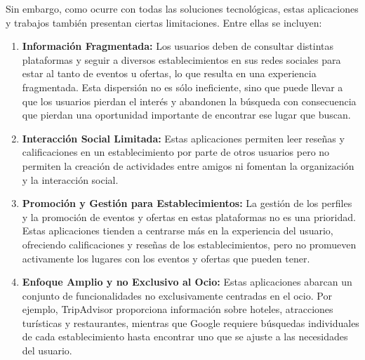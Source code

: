 Sin embargo, como ocurre con todas las soluciones tecnológicas, estas aplicaciones y trabajos también presentan ciertas limitaciones. Entre ellas se incluyen:

\begin{enumerate}

    \item \textbf{Información Fragmentada:} Los usuarios deben de consultar distintas plataformas y seguir a
          diversos establecimientos en sus redes sociales para estar al tanto de eventos u ofertas, lo que resulta en una
          experiencia fragmentada. Esta dispersión no es sólo ineficiente, sino que puede llevar a que los usuarios
          pierdan el interés y abandonen la búsqueda con consecuencia que pierdan una oportunidad importante de encontrar
          ese lugar que buscan.

    \item \textbf{Interacción Social Limitada:} Estas aplicaciones permiten leer reseñas y calificaciones en un
          establecimiento por parte de otros usuarios pero no permiten la creación de actividades entre amigos ni fomentan
          la organización y la interacción social.

    \item \textbf{Promoción y Gestión para Establecimientos:} La gestión de los perfiles y la promoción de eventos y
          ofertas en estas plataformas no es una prioridad. Estas aplicaciones tienden a centrarse más en la experiencia
          del usuario, ofreciendo calificaciones y reseñas de los establecimientos, pero no promueven activamente los
          lugares con los eventos y ofertas que pueden tener.

    \item \textbf{Enfoque Amplio y no Exclusivo al Ocio:} Estas aplicaciones abarcan un conjunto de funcionalidades
          no exclusivamente centradas en el ocio. Por ejemplo, TripAdvisor proporciona información sobre hoteles,
          atracciones turísticas y restaurantes, mientras que Google requiere búsquedas individuales de cada
          establecimiento hasta encontrar uno que se ajuste a las necesidades del usuario.

\end{enumerate}

